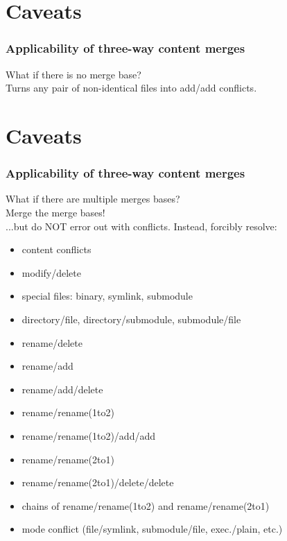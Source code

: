 \documentclass[t]{beamer}
\begin{document}
\section{Caveats}
\begin{frame}
  \frametitle{Applicability of three-way content merges}

  What if there is no merge base?
  \pause
  \\[\baselineskip]
  Turns any pair of non-identical files into add/add conflicts.

\end{frame}


\section{Caveats}
\begin{frame}
  \frametitle{Applicability of three-way content merges}

  What if there are multiple merges bases?
  \pause
  \\[\baselineskip]
  Merge the merge bases!
  \pause
  \\[\baselineskip]
  ...but do NOT error out with conflicts.  Instead, forcibly resolve:
  \pause
  \begin{itemize}[<+->]
    \item content conflicts
    \item modify/delete
    \item special files: binary, symlink, submodule
    \item directory/file, directory/submodule, submodule/file
    \item rename/delete
    \item rename/add
    \item rename/add/delete
    \item rename/rename(1to2)
    \item rename/rename(1to2)/add/add
    \item rename/rename(2to1)
    \item rename/rename(2to1)/delete/delete
    \item chains of rename/rename(1to2) and rename/rename(2to1)
    \item mode conflict (file/symlink, submodule/file, exec./plain, etc.)
  \end{itemize}

\end{frame}
\end{document}
